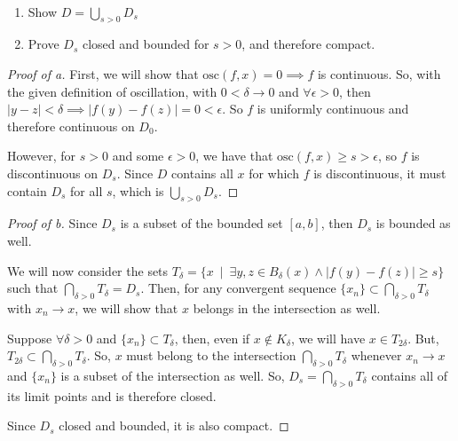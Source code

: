 \documentclass[../hw6]{subfiles}
\begin{document}
\begin{problem}[2]\
\begin{enumerate}[label=(\alph*)]
	\item Show $D=\bigcup_{s>0}D_s$
	\item Prove $D_s$ closed and bounded for  $s>0$, and therefore compact.
\end{enumerate}
\end{problem}
\begin{proof}[Proof of a]
	First, we will show that $\text{osc}(f,x) = 0 \implies f$ is continuous.
	So, with the given definition of oscillation, with $0<\delta\to 0$ and $\forall \epsilon>0$, then $ |y-z|<\delta \implies |f(y)-f(z)| =0<\epsilon$. So $f$ is uniformly continuous and therefore continuous on $D_0$.

	However, for $s>0$ and some $\epsilon > 0$, we have that $\text{osc}(f,x) \ge s > \epsilon$, so $f$ is discontinuous on $D_s$. Since  $D$ contains all $x$ for which  $f$ is discontinuous, it must contain  $D_s$ for all  $s$, which is  $\bigcup\limits_{s>0}D_s$.
\end{proof}
\begin{proof}[Proof of b]
	Since $D_s$ is a subset of the bounded set $[a,b]$, then  $D_s$ is bounded as well.

	We will now consider the sets $T_{\delta} = \{x\ \mid\ \exists y,z \in B_{\delta}(x) \land |f(y)-f(z)|\ge s\} $ such that $\bigcap\limits_{\delta>0}T_{\delta}=D_s$.
	Then, for any convergent sequence $\{x_n\} \subset \bigcap\limits_{\delta>0} T_{\delta}$ with $x_n\to x$, we will show that $x$ belongs in the intersection as well.

	Suppose $\forall \delta>0$ and $ \{x_n\} \subset T_{\delta} $, then, even if $x \not\in K_{\delta}$, we will have $x \in T_{2\delta}$.
	But, $T_{2\delta}\subset \bigcap\limits_{\delta>0} T_{\delta}$.
	So, $x$ must belong to the intersection $\bigcap\limits_{\delta>0} T_{\delta}$ whenever $x_n\to x$ and $\{x_n\}$ is a subset of the intersection as well.
	So, $D_s=\bigcap\limits_{\delta>0} T_{\delta}$ contains all of its limit points and is therefore closed.

	Since $D_s$ closed and bounded, it is also compact.
\end{proof}
\end{document}
